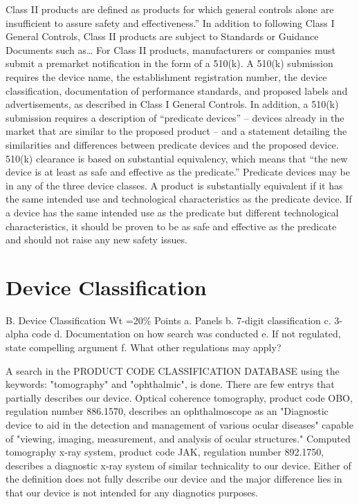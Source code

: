 \documentclass{article}
\begin{document}
Class II products are defined as products for which general controls alone are
insufficient to assure safety and effectiveness.” In addition to following Class I General Controls, Class II products are subject to Standards or Guidance Documents such as… For Class II products, manufacturers or companies must submit a premarket notification in the form of a 510(k). A 510(k) submission requires the device name, the establishment registration number, the device classification, documentation of performance standards, and proposed labels and advertisements, as described in Class I General Controls. In addition, a 510(k) submission requires a description of “predicate devices” – devices already in the market that are similar to the proposed product – and a statement detailing the similarities and differences between predicate devices and the proposed device. 510(k) clearance is based on substantial equivalency, which means that “the new device is at least as safe and effective as the predicate.” Predicate devices may be in any of the three device classes. A product is substantially equivalent if it has the same intended use  and technological characteristics as the predicate device. If a device has the same intended use as the predicate but different technological characteristics, it should be proven to be as safe and effective as the predicate and should not raise any new safety issues. 
	 

\section{Device Classification}
\label{sec:protocols}
B. Device Classification Wt =20\% Points
a. Panels
b. 7-digit classification
c. 3-alpha code
d. Documentation on how search was conducted
e. If not regulated, state compelling argument
f. What other regulations may apply?

A search in the PRODUCT CODE CLASSIFICATION DATABASE using the
keywords: "tomography" and "ophthalmic", is done. There are few entrys
that partially describes our device. Optical coherence tomography,
product code OBO, regulation number 886.1570, describes an
ophthalmoscope as an "Diagnostic device to aid in the detection and
management of various ocular diseases" capable of "viewing, imaging,
measurement, and analysis of ocular structures."  Computed tomography
x-ray system, product code JAK, regulation number 892.1750, describes
a diagnostic x-ray system of similar technicality to our
device. Either of the definition does not fully describe our device
and the major difference lies in that our device is not intended for
any diagnotics purposes.
\end{document}
